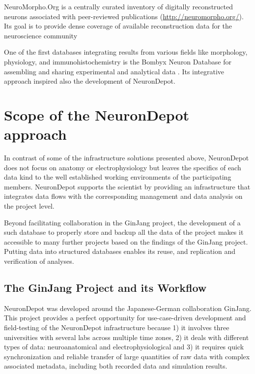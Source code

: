 \documentclass{frontiersSCNS} %
\begin{document}
NeuroMorpho.Org is a centrally curated inventory of digitally reconstructed
neurons associated with peer-reviewed publications
(\url{http://neuromorpho.org/}). Its goal is to provide dense coverage of
available reconstruction data for the neuroscience community \citep{Ascoli2007}

One of the first databases integrating results from various fields like
morphology, physiology, and immunohistochemistry is the Bombyx Neuron Database
for assembling and sharing experimental and analytical data \citep{Kazawa2008}.
Its integrative approach inspired also the development of NeuronDepot.


\section{Scope of the NeuronDepot approach}

In contrast of some of the infrastructure solutions presented above,
NeuronDepot does
not focus on anatomy or electrophysiology but leaves the specifics of each data
kind to the well established working environments of the participating members.
NeuronDepot supports the scientist by providing an infrastructure that
integrates data flows with the corresponding management and data analysis on
the project level.

Beyond facilitating collaboration in the GinJang project,  the development of a
such database to properly store and backup all the data of the project makes it
accessible to many further projects based on the findings of the GinJang
project. Putting data into structured databases enables its reuse, and
replication and verification of analyses.

\subsection{The GinJang Project and its Workflow}

NeuronDepot was developed around the Japanese-German collaboration GinJang.
This project provides a perfect opportunity for use-case-driven development and
field-testing of the NeuronDepot infrastructure because 1) it involves three
universities with several labs across multiple time zones, 2) it deals with
different types of data: neuroanatomical and electrophysiological and 3) it
requires quick synchronization and reliable transfer of large quantities of raw
data with complex associated metadata, including both recorded data and
simulation results.
\end{document}
